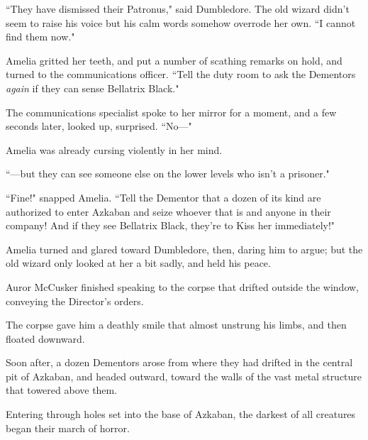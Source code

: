``They have dismissed their Patronus," said Dumbledore. The old wizard didn't seem to raise his voice but his calm words somehow overrode her own. ``I cannot find them now."

Amelia gritted her teeth, and put a number of scathing remarks on hold, and turned to the communications officer. ``Tell the duty room to ask the Dementors \emph{again} if they can sense Bellatrix Black."

The communications specialist spoke to her mirror for a moment, and a few seconds later, looked up, surprised. ``No—"

Amelia was already cursing violently in her mind.

``—but they can see someone else on the lower levels who isn't a prisoner."

``Fine!" snapped Amelia. ``Tell the Dementor that a dozen of its kind are authorized to enter Azkaban and seize whoever that is and anyone in their company! And if they see Bellatrix Black, they're to Kiss her immediately!"

Amelia turned and glared toward Dumbledore, then, daring him to argue; but the old wizard only looked at her a bit sadly, and held his peace.

\later

Auror McCusker finished speaking to the corpse that drifted outside the window, conveying the Director's orders.

The corpse gave him a deathly smile that almost unstrung his limbs, and then floated downward.

Soon after, a dozen Dementors arose from where they had drifted in the central pit of Azkaban, and headed outward, toward the walls of the vast metal structure that towered above them.

Entering through holes set into the base of Azkaban, the darkest of all creatures began their march of horror.

